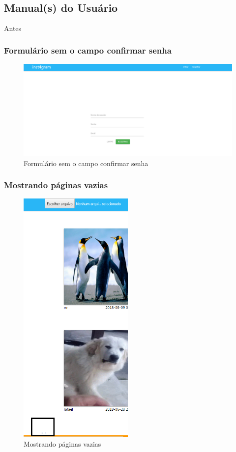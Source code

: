 \subsection{Manual(s) do Usuário}
Antes
\subsubsection{Formulário sem o campo confirmar senha}
\begin{figure}[ht]
	\centering
	\includegraphics[width=\textwidth]{./imagens/confirmacao_senha.png}
	\caption{Formulário sem o campo confirmar senha}
	\label{fig:casoDeUso}
\end{figure}

\pagebreak

\subsubsection{Mostrando páginas vazias}
\begin{figure}[ht]
	\centering
	\includegraphics[width=0.5\textwidth]{./imagens/paginas.png}
	\caption{Mostrando páginas vazias}
	\label{fig:casoDeUso}
\end{figure}

